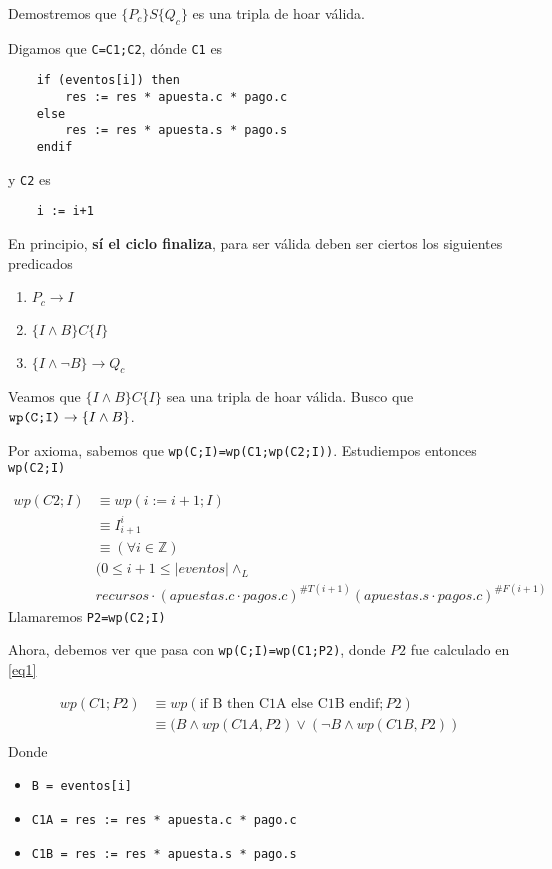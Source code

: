 \documentclass[document.tex]{subfiles}
\begin{document}
Demostremos que $\{P_c\}S\{Q_c\}$ es una tripla de hoar válida.

Digamos que \verb+C=C1;C2+, dónde \verb+C1+ es
\begin{verbatim}
    if (eventos[i]) then
        res := res * apuesta.c * pago.c
    else
        res := res * apuesta.s * pago.s
    endif
\end{verbatim}

y \verb+C2+ es
\begin{verbatim}
    i := i+1
\end{verbatim}

En principio, \textbf{sí el ciclo finaliza}, para ser válida deben ser ciertos los siguientes predicados
\begin{enumerate}
    \item $P_c \to I$
    \item $\{I \land B\}C\{I\}$
    \item $\{I \land \neg B\} \to Q_c$
\end{enumerate}

Veamos que $\{I \land B\}C\{I\}$ sea una tripla de hoar válida. Busco que $\verb+wp(C;I)+ \to \{I \land B\}$.

Por axioma, sabemos que \verb+wp(C;I)=wp(C1;wp(C2;I))+. Estudiempos entonces \verb|wp(C2;I)|

\begin{equation} \label{eq1}
\begin{split}
wp(C2;I) & \equiv wp(i := i+1;I) \\
         & \equiv I^{i}_{i+1} \\
         & \equiv (\forall i \in \mathbb{Z})\\
         &(0\leq i+1 \leq |eventos| \land_L\\ 
         &recursos \cdot (apuestas.c\cdot pagos.c)^{\#T(i+1)}(apuestas.s\cdot pagos.c)^{\#F(i+1)}
\end{split}
\end{equation}
Llamaremos \verb|P2=wp(C2;I)|

Ahora, debemos ver que pasa con \verb+wp(C;I)=wp(C1;P2)+, donde $P2$ fue calculado en \ref{eq1}

\begin{equation} \label{eq2}
\begin{split}
wp(C1;P2) & \equiv wp(\text{if B then C1A else C1B endif};P2) \\
          & \equiv (B \land wp(C1A, P2) \lor (\neg B \land wp(C1B, P2)) \\
\end{split}
\end{equation}
Donde
\begin{itemize}
    \item \verb|B = eventos[i]|
    \item \verb|C1A = res := res * apuesta.c * pago.c|
    \item \verb|C1B = res := res * apuesta.s * pago.s|
\end{itemize}
\end{document}

